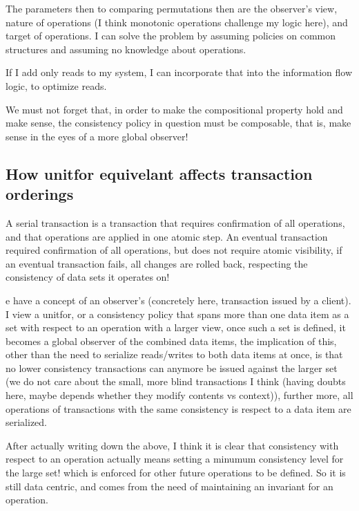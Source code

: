 The parameters then to comparing permutations then are the observer's view,
nature of operations (I think monotonic operations challenge my logic here), and
target of operations. I can solve the problem by assuming policies on common
structures and assuming no knowledge about operations. 

If I add only reads to my system, I can incorporate that into the information flow logic,
to optimize reads. 

We must not forget that, in order to make the compositional property hold and
make sense, the consistency policy in question must be composable, that is, make
sense in the eyes of a more global observer!

\subsection{How unitfor equivelant affects transaction orderings}
A serial transaction is a transaction that requires confirmation of all
operations, and that operations are applied 
in one atomic step. An eventual transaction required confirmation of all
operations, but does not require atomic visibility, if an eventual transaction
fails, all changes are rolled back, respecting the consistency of data sets it
operates on! 

e have a concept of an observer's (concretely here, transaction issued by a
client). I view a unitfor, or a consistency policy that spans more than one data
item as a set with respect to an operation with a larger view, once such a set
is defined, it becomes a global observer of the combined data items, the
implication of this, other than the need to serialize reads/writes to both data
items at once, is that no lower consistency transactions can anymore be issued
against the larger set (we do not care about the small, more blind transactions
I think (having doubts here, maybe depends whether they modify contents vs
context)), further more, all operations of transactions with the same
consistency is respect to a data item are serialized. 

After actually writing down the above, I think it is clear that consistency with
respect to an operation actually means setting a minumum consistency level for
the large set! which is enforced for other future operations to be defined. So
it is still data centric, and comes from the need of maintaining an invariant
for an operation.

